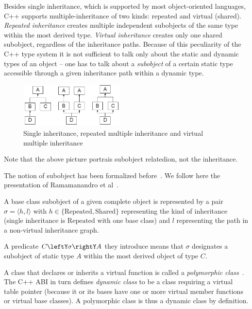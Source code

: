 \documentclass[preprint]{sigplanconf}
\begin{document}
Besides single inheritance, which is supported by most object-oriented languages, 
C++ supports multiple-inheritance of two kinds: repeated and virtual (shared). 
\emph{Repeated inheritance} creates multiple independent subobjects of the same 
type within the most derived type. \emph{Virtual inheritance} creates only one 
shared subobject, regardless of the inheritance paths. Because of this 
peculiarity of the C++ type system it is not sufficient to talk only about the 
static and dynamic types of an object -- one has to talk about a 
\emph{subobject} of a certain static type accessible through a given inheritance 
path within a dynamic type.

\begin{figure}[tbp]
  \centering
    \includegraphics[width=0.47\textwidth]{Hierarchies.png}
  \caption{Single inheritance, repeated multiple inheritance and virtual multiple inheritance}
  \label{fig:hierarchy}
\end{figure}

\noindent
Note that the above picture portrais subobject relatedion, not the inheritance.

The notion of subobject has been formalized before~\cite{RF95,WNST06,RDL11}.
We follow here the presentation of Ramamanandro et al~\cite{RDL11}.

A base class subobject of a given complete object is represented by a pair 
$\sigma = \langle h,l\rangle$ with $h \in \{\mathrm{Repeated},\mathrm{Shared}\}$ representing the 
kind of inheritance (single inheritance is $\mathrm{Repeated}$ with one base class) and $l$ 
representing the path in a non-virtual inheritance graph.

A predicate $C\leftY\sigma\rightY A$ they introduce means that $\sigma$ 
designates a subobject of static type $A$ within the most derived object of 
type $C$.

A class that declares or inherits a virtual function is called a 
\emph{polymorphic class}~\cite[]{C++0x}. The C++ ABI in turn defines 
\emph{dynamic class} to be a class requiring a virtual table pointer (because it 
or its bases have one or more virtual member functions or virtual base classes). 
A polymorphic class is thus a dynamic class by definition.
\end{document}
